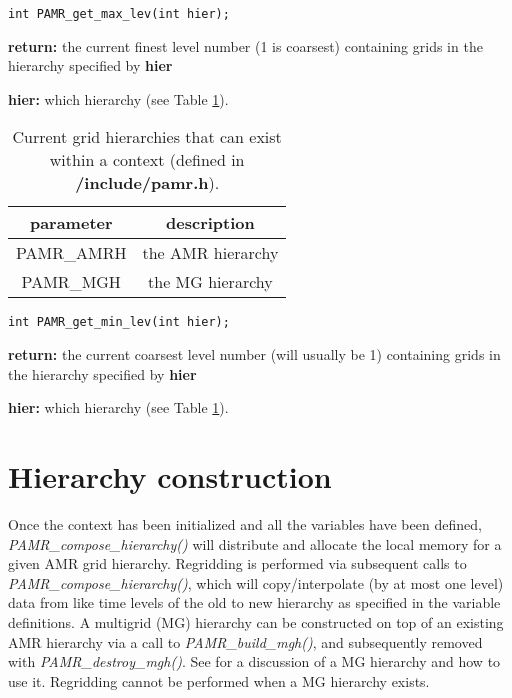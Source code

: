 \documentclass[aps,amssymb,unsortedaddress,nofootinbib]{revtex4}
\def\lsep{\itemsep 0.05in}
\begin{document}

\begin{verbatim}
int PAMR_get_max_lev(int hier);
\end{verbatim}
\begin{list}{}{\lsep}
\item {\bf return:} the current finest level number (1 is coarsest) containing grids in the hierarchy
                    specified by {\bf hier}
\item {\bf hier:} which hierarchy (see Table \ref{tab_hier}).
\end{list}

\begin{table}
\begin{center}
\begin{tabular}[t]{| c || c |}
\hline
parameter & description \\
\hline
\hline
PAMR\_AMRH  & the AMR hierarchy \\
PAMR\_MGH   & the MG hierarchy\\
\hline
\end{tabular}
\end{center}
\caption
{ Current grid hierarchies that can exist within a context (defined in {\bf /include/pamr.h}).
\label{tab_hier}}
\end{table}


\begin{verbatim}
int PAMR_get_min_lev(int hier);
\end{verbatim}
\begin{list}{}{\lsep}
\item {\bf return:} the current coarsest level number (will usually be 1) containing grids in the hierarchy
                    specified by {\bf hier}
\item {\bf hier:} which hierarchy (see Table \ref{tab_hier}).
\end{list}


\section{Hierarchy construction}
Once the context has been initialized and all the variables have been defined,
{\em PAMR\_compose\_hierarchy()} will distribute and allocate the local memory for 
a given AMR grid hierarchy. Regridding is performed via subsequent calls to
{\em PAMR\_compose\_hierarchy()}, which will copy/interpolate (by at most one level) 
data from like time levels of 
the old to new hierarchy as specified in the variable definitions. A multigrid (MG) hierarchy can
be constructed on top of an existing AMR hierarchy via a call to 
{\em PAMR\_build\_mgh()}, and subsequently removed with {\em PAMR\_destroy\_mgh()}.
See \cite{fpthesis} for a discussion of a MG hierarchy and how to use it.
Regridding cannot be performed when a MG hierarchy exists. 
\end{document}
